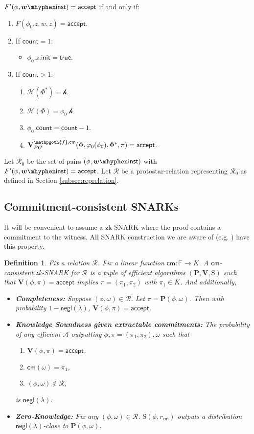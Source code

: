 \documentclass[11pt]{article} %
\newcommand{\F}{\ensuremath{\mathbb F}\xspace}
\newcommand{\adv}{\ensuremath{\mathcal A}\xspace}
\newcommand{\cm}{\ensuremath{\mathsf{cm}}\xspace}
\newcommand{\negl}{\ensuremath{\mathsf{negl}(\lambda)}\xspace}
\newcommand{\accept}{\ensuremath{\mathsf{accept}}\xspace}
\newcommand{\hash}{\ensuremath{\mathcal{H}}\xspace}
\renewcommand{\sim}{\ensuremath{\mathrm{S}}\xspace}
\newcommand{\prv}{\ensuremath{\mathsf{\mathbf{P}}}\xspace}
\newcommand{\prf}{\ensuremath{\mathsf{\pi}}\xspace}
\newcommand{\inst}{\ensuremath{\phi}\xspace}
\newcommand{\wit}{\ensuremath{\mathsf{\omega}}\xspace}
\newcommand{\instFprime}{\ensuremath{\inst}\xspace}%
\newcommand{\witFprime}{\ensuremath{\witinst}\xspace}%
\newcommand{\acchash}{\ensuremath{\mathscr{h}}\xspace}
\newcommand{\cnt}{\ensuremath{\mathsf{count}}\xspace}
\newcommand{\ver}{\ensuremath{\mathsf{\mathbf{V}}}\xspace}
\newcommand{\verpg}{\ensuremath{\ver^{\predinst,\cm}_{PG}}\xspace}
\newcommand{\rel}{\ensuremath{\mathcal{R}}\xspace}
\newtheorem{dfn}[lemma]{Definition}
\newcommand{\instt}{\ensuremath{\Phi^*}\xspace}
\newcommand{\insttbase}{\ensuremath{\Phi}\xspace}
\newcommand{\init}{\ensuremath{\mathsf{init}}\xspace}
\newcommand{\true}{\ensuremath{\mathsf{true}}\xspace}
\newcommand{\predinst}{\ensuremath{\mathpgoth{f}}\xspace}
\newcommand{\cmsetup}{\ensuremath{r_\cm}\xspace}
\newcommand{\relzer}{\ensuremath{\rel_{0}}\xspace}
\begin{document}
\noindent
$F'(\instFprime,\witFprime)=\accept$ if and only if:
\begin{enumerate}
    \item $F(\instFprime_0.z, w,z)=\accept$.
    \item If $\cnt=1$:
    \begin{itemize}
        \item $\instFprime_0.z.\init=\true$.
    \end{itemize}
    \item If $\cnt>1$:
    \begin{enumerate}
        \item $\hash(\instt)=\acchash$.
        \item $\hash(\insttbase)=\instFprime_0.\acchash$.
        \item $\instFprime_0.\cnt=\cnt-1$.
        \item $\verpg(\insttbase,\varphi_0(\instFprime_0),\instt,\prf)=\accept$.
    \end{enumerate}
\end{enumerate}
Let $\relzer$ be the set of pairs $(\instFprime,\witFprime)$ with $F'(\instFprime,\witFprime)=\accept$.
Let $\rel$ be a protostar-relation representing \relzer as defined in Section \ref{subsec:reprelation}.

\subsection{Commitment-consistent SNARKs}
It will be convenient to assume a zk-SNARK where the proof contains a commitment to the witness. All SNARK construction we are aware of  (e.g. \cite{plonk}) have this property. 

\begin{dfn}\label{dfn:cmsnark}
Fix a relation \rel. Fix a linear function $\cm:\F\to K$. A \emph{$\cm$-consistent  zk-SNARK for \rel} is a tuple of efficient algorithms $(\prv,\ver,\sim)$ such that  $\ver(\inst,\prf)=\accept$ implies  $\prf=(\prf_1,\prf_2)$ with $\prf_1\in K$.
And additionally,
\begin{itemize}
 \item \textbf{Completeness:} Suppose $(\inst,\wit)\in \rel$. Let $\prf=\prv(\inst,\wit)$. Then with probability $1-\negl$, $\ver(\inst,\prf)=\accept$.
 \item \textbf{Knowledge Soundness given extractable commitments:}
 The probability of any efficient \adv outputting $\inst,\prf=(\prf_1,\prf_2),\wit$ such that
 \begin{enumerate}
  \item $\ver(\inst,\prf)=\accept$,
  \item $\cm(\wit)=\prf_1$,
  \item $(\inst,\wit)\notin \rel$, 
 \end{enumerate}
is \negl.
 \item \textbf{Zero-Knowledge:} Fix any $(\inst,\wit)\in \rel$. $\sim(\inst,\cmsetup)$ outputs a distribution \negl-close to $\prv(\inst,\wit)$.
\end{itemize}
\end{dfn}
\end{document}
